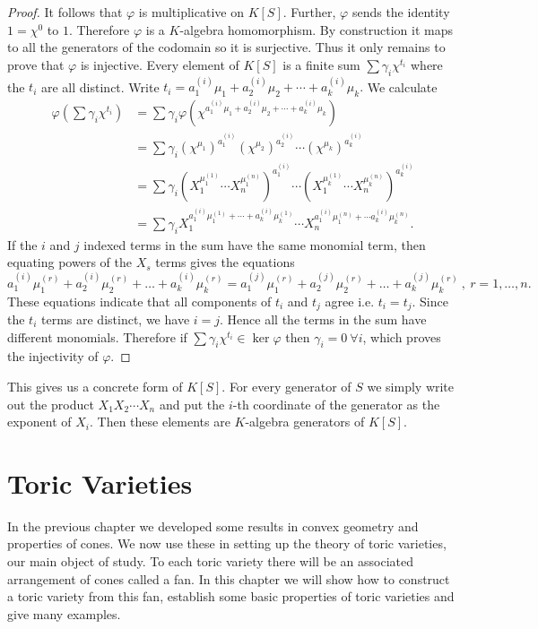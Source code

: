 \documentclass[BSc]{usydthesis}
\numberwithin{equation}{chapter}
\theoremstyle{remark}
\begin{document}
\begin{proof}
It follows that $\varphi$ is multiplicative on $K[S].$ Further, $\varphi$ sends the identity $1=\chi^0$ to $1.$ Therefore $\varphi$ is a $K$-algebra homomorphism. By construction it maps to all the generators of the codomain so it is surjective. Thus it only remains to prove that $\varphi$ is injective. Every element of $K[S]$ is a finite sum $\sum \gamma_i \chi^{t_i}$ where the $t_i$ are all distinct. Write $t_i = a_1^{(i)} \mu_1 + a_2^{(i)} \mu_2 + \cdots + a_k^{(i)} \mu_k.$ We calculate 
\begin{align*}
 \varphi \left(\sum \gamma_i \chi^{t_i} \right) &= \sum \gamma_i \varphi \left(\chi^{a_1^{(i)} \mu_1 + a_2^{(i)} \mu_2 + \cdots + a_k^{(i)} \mu_k } \right) \\
 &= \sum \gamma_i (\chi^{\mu_1})^{a_1^{(i)}} (\chi^{\mu_2})^{a_2^{(i)}} \cdots (\chi^{\mu_k})^{a_k^{(i)}} \\
 &= \sum \gamma_i \left( X_1^{\mu_1^{(1)}} \cdots X_n^{\mu_1^{(n)}}\right)^{a_1^{(i)}} \cdots \left(X_1^{\mu_k^{(1)}} \cdots X_n^{\mu_k^{(n)}} \right)^{a_k^{(i)}} \\
 &= \sum \gamma_i X_1^{ a_1^{(i)} \mu_1^{(1)} + \cdots + a_k^{(i)} \mu_k^{(1)}} \cdots X_n^{ a_1^{(i)}\mu_1^{(n)} + \cdots a_k^{(i)} \mu_k^{(n)}}.
\end{align*}
If the $i$ and $j$ indexed terms in the sum have the same monomial term, then equating powers of the $X_s$ terms gives the equations $$a_1^{(i)}\mu_1^{(r)} + a_2^{(i)} \mu_2^{(r)} + \ldots + a_k^{(i)} \mu_k^{(r)} = a_1^{(j)}\mu_1^{(r)} + a_2^{(j)} \mu_2^{(r)} + \ldots + a_k^{(j)} \mu_k^{(r)} \ , \ r=1,\ldots, n. $$ These equations indicate that all components of $t_i$ and $t_j$ agree i.e. $t_i=t_j.$ Since the $t_i$ terms are distinct, we have $i=j.$ Hence all the terms in the sum have different monomials. Therefore if $\sum \gamma_i \chi^{t_i} \in \ker \varphi$ then $\gamma_i=0 \ \forall i$, which proves the injectivity of $\varphi.$ 
 
\end{proof}

This gives us a concrete form of $K[S].$ For every generator of $S$ we simply write out the product $X_1 X_2 \cdots X_n$ and put the $i$-th coordinate of the generator as the exponent of $X_i.$ Then these elements are $K$-algebra generators of $K[S].$

\chapter{Toric Varieties}
In the previous chapter we developed some results in convex geometry and properties of cones. We now use these in setting up the theory of toric varieties, our main object of study. To each toric variety there will be an associated arrangement of cones called a fan. In this chapter we will show how to construct a toric variety from this fan, establish some basic properties of toric varieties and give many examples. 
\end{document}
